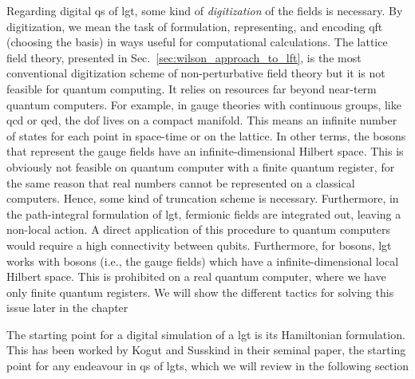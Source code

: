 Regarding digital \ac{qs} of \ac{lgt}, some kind of \emph{digitization} of the fields is necessary.
By digitization, we mean the task of formulation, representing, and encoding \ac{qft} (choosing the basis) in ways useful for computational calculations.
The lattice field theory, presented in Sec.~\ref{sec:wilson_approach_to_lft}, is the most conventional digitization scheme of non-perturbative field theory but it is not feasible for quantum computing.
It relies on resources far beyond near-term quantum computers.
For example, in gauge theories with continuous groups, like \ac{qcd} or \ac{qed}, the \ac{dof} lives on a compact manifold.
This means an infinite number of states for each point in space-time or on the lattice.
In other terms, the bosons that represent the gauge fields have an infinite-dimensional Hilbert space.
This is obviously not feasible on quantum computer with a finite quantum register, for the same reason that real numbers cannot be represented on a classical computers.
Hence, some kind of truncation scheme is necessary.
Furthermore, in the path-integral formulation of \ac{lgt}, fermionic fields are integrated out, leaving a non-local action.
A direct application of this procedure to quantum computers would require a high connectivity between qubits.
Furthermore, for bosons, \ac{lgt} works with bosons (i.e., the gauge fields) which have a infinite-dimensional local Hilbert space.
This is prohibited on a real quantum computer, where we have only finite quantum registers.
We will show the different tactics for solving this issue later in the chapter

The starting point for a digital simulation of a \ac{lgt} is its Hamiltonian formulation.
This has been worked by Kogut and Susskind in their seminal paper\citneeded, the starting point for any endeavour in \ac{qs} of \ac{lgt}s, which we will review in the following section


